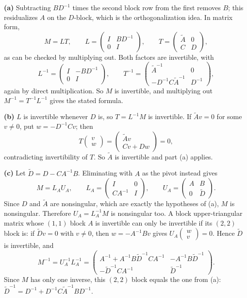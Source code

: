\documentclass[answers,12pt,addpoints]{exam}
\begin{document}
\begin{questions}
\begin{solution}
\textbf{(a)} Subtracting $BD^{-1}$ times the second block row from the first
removes $B$; this residualizes $A$ on the $D$-block, which is the
orthogonalization idea. In matrix form,
\[
M=LT,\qquad
L=\begin{pmatrix}I&BD^{-1}\\0&I\end{pmatrix},\qquad
T=\begin{pmatrix}\widetilde A&0\\C&D\end{pmatrix},
\]
as can be checked by multiplying out. Both factors are invertible, with
\[
L^{-1}=\begin{pmatrix}I&-BD^{-1}\\0&I\end{pmatrix},\qquad
T^{-1}=\begin{pmatrix}\widetilde A^{-1}&0\\-D^{-1}C\widetilde A^{-1}&D^{-1}\end{pmatrix},
\]
again by direct multiplication. So $M$ is invertible, and multiplying out
$M^{-1}=T^{-1}L^{-1}$ gives the stated formula.
 
\textbf{(b)} $L$ is invertible whenever $D$ is, so $T=L^{-1}M$ is invertible.
If $\widetilde Av=0$ for some $v\neq0$, put $w=-D^{-1}Cv$; then
\[
T\begin{pmatrix}v\\w\end{pmatrix}
=\begin{pmatrix}\widetilde Av\\Cv+Dw\end{pmatrix}=0,
\]
contradicting invertibility of $T$. So $\widetilde A$ is invertible and part
(a) applies.
 
\textbf{(c)} Let $\widetilde D=D-CA^{-1}B$. Eliminating with $A$ as the pivot
instead gives
\[
M=L_AU_A,\qquad
L_A=\begin{pmatrix}I&0\\CA^{-1}&I\end{pmatrix},\qquad
U_A=\begin{pmatrix}A&B\\0&\widetilde D\end{pmatrix}.
\]
Since $D$ and $\widetilde A$ are nonsingular, which are exactly the hypotheses of (a), $M$ is nonsingular. Therefore $U_A=L_A^{-1}M$ is nonsingular too. A block upper-triangular
matrix whose $(1,1)$ block $A$ is invertible can only be invertible if its
$(2,2)$ block is: if $\widetilde Dv=0$ with $v\neq0$, then $w=-A^{-1}Bv$ gives
$U_A\begin{pmatrix}w\\v\end{pmatrix}=0$. Hence $\widetilde D$ is invertible,
and
\[
M^{-1}=U_A^{-1}L_A^{-1}
=\begin{pmatrix}
A^{-1}+A^{-1}B\widetilde D^{-1}CA^{-1}&-A^{-1}B\widetilde D^{-1}\\
-\widetilde D^{-1}CA^{-1}&\widetilde D^{-1}
\end{pmatrix}.
\]
Since $M$ has only one inverse, this $(2,2)$ block equals the one from (a):
$\widetilde D^{-1}=D^{-1}+D^{-1}C\widetilde A^{-1}BD^{-1}$.
 

\end{solution}
\end{questions}
\end{document}

